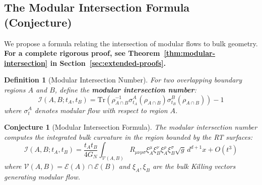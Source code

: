 \documentclass[12pt,a4paper]{article}
\newtheorem{conjecture}[theorem]{Conjecture}
\newtheorem{definition}[theorem]{Definition}
\begin{document}
\subsection{The Modular Intersection Formula (Conjecture)}
\label{sec:conj-modular-intersection}

We propose a formula relating the intersection of modular flows to bulk geometry. \textbf{For a complete rigorous proof, see Theorem~\ref{thm:modular-intersection} in Section~\ref{sec:extended-proofs}.}

\begin{definition}[Modular Intersection Number]
For two overlapping boundary regions $A$ and $B$, define the \textbf{modular intersection number}:
\begin{equation}
\mathcal{I}(A, B; t_A, t_B) = \text{Tr}\left( \rho_{A \cap B}^{-1} \sigma_{t_A}^A(\rho_{A \cap B}) \sigma_{t_B}^B(\rho_{A \cap B}) \right) - 1
\end{equation}
where $\sigma_t^A$ denotes modular flow with respect to region $A$.
\end{definition}

\begin{conjecture}[Modular Intersection Formula]
The modular intersection number computes the integrated bulk curvature in the region bounded by the RT surfaces:
\begin{equation}
\mathcal{I}(A, B; t_A, t_B) = \frac{t_A t_B}{4G_N} \int_{\mathcal{V}(A,B)} R_{\mu\nu\rho\sigma} \xi_A^\mu \xi_B^\nu \xi_A^\rho \xi_B^\sigma \sqrt{g} \, d^{d+1}x + O(t^3)
\end{equation}
where $\mathcal{V}(A,B) = \mathcal{E}(A) \cap \mathcal{E}(B)$ and $\xi_A, \xi_B$ are the bulk Killing vectors generating modular flow.
\end{conjecture}
\end{document}
